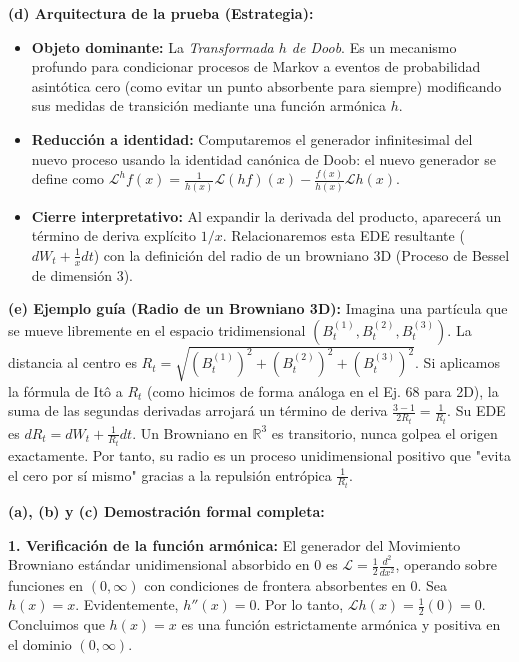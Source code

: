 \documentclass[11pt, letterpaper]{article}
\begin{document}
\begin{solucion}
    \textbf{(d) Arquitectura de la prueba (Estrategia):}
    \begin{itemize}
        \item[(i)] \textbf{Objeto dominante:} La \textit{Transformada $h$ de Doob}. Es un mecanismo profundo para condicionar procesos de Markov a eventos de probabilidad asintótica cero (como evitar un punto absorbente para siempre) modificando sus medidas de transición mediante una función armónica $h$.
        \item[(ii)] \textbf{Reducción a identidad:} Computaremos el generador infinitesimal del nuevo proceso usando la identidad canónica de Doob: el nuevo generador se define como $\mathcal{L}^h f(x) = \frac{1}{h(x)} \mathcal{L}(hf)(x) - \frac{f(x)}{h(x)}\mathcal{L}h(x)$.
        \item[(iii)] \textbf{Cierre interpretativo:} Al expandir la derivada del producto, aparecerá un término de deriva explícito $1/x$. Relacionaremos esta EDE resultante ($dW_t + \frac{1}{x}dt$) con la definición del radio de un browniano 3D (Proceso de Bessel de dimensión 3).
    \end{itemize}

    \vspace{3mm}
    \textbf{(e) Ejemplo guía (Radio de un Browniano 3D):}
    Imagina una partícula que se mueve libremente en el espacio tridimensional $(B_t^{(1)}, B_t^{(2)}, B_t^{(3)})$. La distancia al centro es $R_t = \sqrt{(B_t^{(1)})^2 + (B_t^{(2)})^2 + (B_t^{(3)})^2}$.
    Si aplicamos la fórmula de Itô a $R_t$ (como hicimos de forma análoga en el Ej. 68 para 2D), la suma de las segundas derivadas arrojará un término de deriva $\frac{3-1}{2 R_t} = \frac{1}{R_t}$. Su EDE es $dR_t = dW_t + \frac{1}{R_t} dt$.
    Un Browniano en $\mathbb{R}^3$ es transitorio, nunca golpea el origen exactamente. Por tanto, su radio es un proceso unidimensional positivo que "evita el cero por sí mismo" gracias a la repulsión entrópica $\frac{1}{R_t}$.

    \textbf{(a), (b) y (c) Demostración formal completa:}

    \textbf{1. Verificación de la función armónica:}
    El generador del Movimiento Browniano estándar unidimensional absorbido en $0$ es $\mathcal{L} = \frac{1}{2} \frac{d^2}{dx^2}$, operando sobre funciones en $(0, \infty)$ con condiciones de frontera absorbentes en 0.
    Sea $h(x) = x$. Evidentemente, $h''(x) = 0$. Por lo tanto, $\mathcal{L}h(x) = \frac{1}{2}(0) = 0$.
    Concluimos que $h(x) = x$ es una función estrictamente armónica y positiva en el dominio $(0, \infty)$.


\end{solucion}
\end{document}
